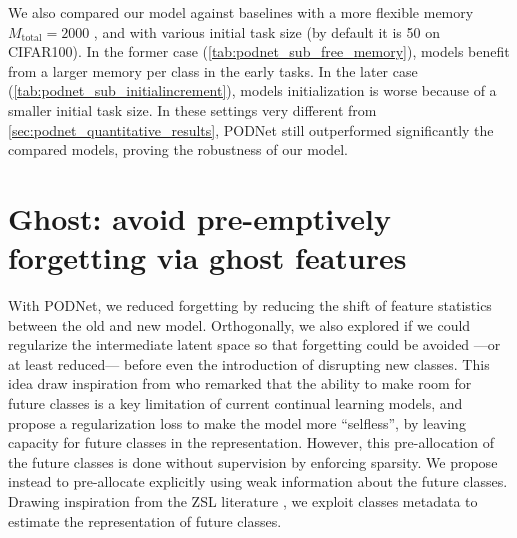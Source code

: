 We also compared our model against baselines with a more flexible memory $M_{\text{total}} = 2000$
\citep{rebuffi2017icarl,wu2019bias_correction}, and with various initial task size (by default it is
50 on CIFAR100). In the former case (\autoref{tab:podnet_sub_free_memory}), models benefit from a
larger memory per class in the early tasks. In the later case
(\autoref{tab:podnet_sub_initialincrement}), models initialization is worse because of a smaller
initial task size. In these settings very different from \autoref{sec:podnet_quantitative_results},
\ac{PODNet} still outperformed significantly the compared models, proving the robustness of our
model.






\section{Ghost: avoid pre-emptively forgetting via ghost features}
\label{sec:ghost}

With PODNet, we reduced forgetting by reducing the shift of feature statistics between the old and
new model. Orthogonally, we also explored if we could regularize the intermediate latent space so
that forgetting could be avoided ---or at least reduced--- before even the introduction of
disrupting new classes. This idea draw inspiration from \cite{aljundi2019selfless} who remarked that
the ability to make room for future classes is a key limitation of current continual learning
models, and propose a regularization loss to make the model more “selfless”, by leaving capacity for
future classes in the representation. However, this pre-allocation of the future classes is done
without supervision by enforcing sparsity. We propose instead to pre-allocate explicitly using weak
information about the future classes. Drawing inspiration from the \acf{ZSL} literature
\citep{lampert2009zeroshot}, we exploit classes metadata to estimate the representation of future
classes.

